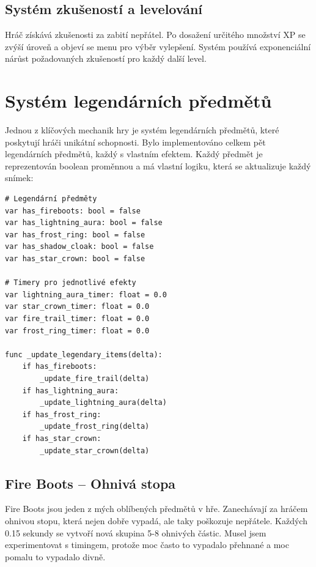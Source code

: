 \documentclass[12pt, a4paper,
oneside
]{report}
\begin{document}
	\section{Systém zkušeností a levelování}
	
	Hráč získává zkušenosti za zabití nepřátel. Po dosažení určitého množství XP se zvýší úroveň a objeví se menu pro výběr vylepšení. Systém používá exponenciální nárůst požadovaných zkušeností pro každý další level.

	\chapter{Systém legendárních předmětů}
	\nopagebreak
	
	Jednou z klíčových mechanik hry je systém legendárních předmětů, které poskytují hráči unikátní schopnosti. Bylo implementováno celkem pět legendárních předmětů, každý s vlastním efektem. Každý předmět je reprezentován boolean proměnnou a má vlastní logiku, která se aktualizuje každý snímek:
	\nopagebreak
	
\begin{lstlisting}[style=GDScript, caption={Struktura legendárních předmětů}]
# Legendární předměty
var has_fireboots: bool = false
var has_lightning_aura: bool = false
var has_frost_ring: bool = false
var has_shadow_cloak: bool = false
var has_star_crown: bool = false

# Timery pro jednotlivé efekty
var lightning_aura_timer: float = 0.0
var star_crown_timer: float = 0.0
var fire_trail_timer: float = 0.0
var frost_ring_timer: float = 0.0

func _update_legendary_items(delta):
	if has_fireboots:
		_update_fire_trail(delta)
	if has_lightning_aura:
		_update_lightning_aura(delta)
	if has_frost_ring:
		_update_frost_ring(delta)
	if has_star_crown:
		_update_star_crown(delta)
\end{lstlisting}

	\section{Fire Boots -- Ohnivá stopa}
	\nopagebreak
	
	Fire Boots jsou jeden z mých oblíbených předmětů v hře. Zanechávají za hráčem ohnivou stopu, která nejen dobře vypadá, ale taky poškozuje nepřátele. Každých 0.15 sekundy se vytvoří nová skupina 5-8 ohnivých částic. Musel jsem experimentovat s timingem, protože moc často to vypadalo přehnané a moc pomalu to vypadalo divně.
	\nopagebreak
	
\end{document}
